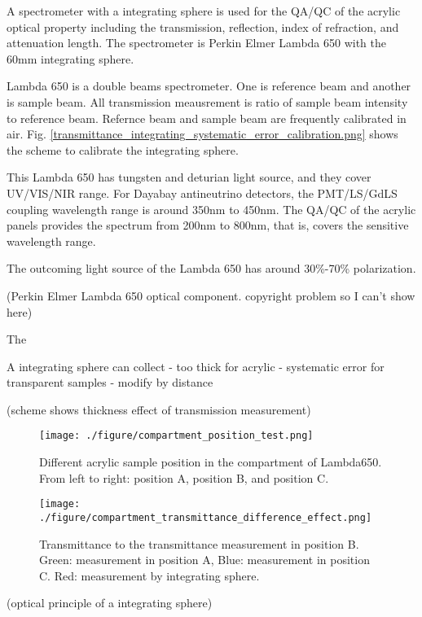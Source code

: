 A spectrometer with a integrating sphere is used for the QA/QC
of the acrylic optical property including
the transmission, reflection, index of refraction, and attenuation length.
The spectrometer is Perkin Elmer Lambda 650 with the 60mm integrating sphere.

Lambda 650 is a double beams spectrometer. One is reference beam and another is
sample beam. All transmission meausrement is ratio of sample beam intensity to
reference beam. Refernce beam and sample beam are frequently calibrated in air.
Fig. \ref{transmittance_integrating_systematic_error_calibration.png} shows the scheme
to calibrate the integrating sphere.

This Lambda 650 has tungsten and deturian light source, and they cover UV/VIS/NIR
range. For Dayabay antineutrino detectors, the PMT/LS/GdLS coupling wavelength range
is around 350nm to 450nm. The QA/QC of the acrylic panels provides the spectrum
from 200nm to 800nm, that is, covers the sensitive wavelength range.

The outcoming light source of the Lambda 650 has around 30\%-70\% polarization.


(Perkin Elmer Lambda 650 optical component. copyright problem so I can't show here)


The


A integrating sphere can collect
    - too thick for acrylic
    - systematic error for transparent samples
        - modify by distance


(scheme shows thickness effect of transmission measurement)


\begin{figure}[h]
    \centering
    \texttt{[image: ./figure/compartment\_position\_test.png]}
    \caption{Different acrylic sample position in the compartment of Lambda650. From
 left to right: position A, position B, and position C.}
    \label{compartment_position_test.png}
    \end{figure}


\begin{figure}[h]
    \centering
    \texttt{[image: ./figure/compartment\_transmittance\_difference\_effect.png]}
    \caption{Transmittance to the transmittance measurement in position B. Green: measurement in position A, Blue:
 measurement in position C. Red: measurement by integrating sphere.}
    \label{compartment_transmittance_difference_effect.png}
    \end{figure}


(optical principle of a integrating sphere)


